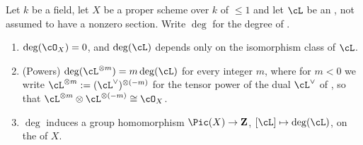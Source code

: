 \begin{lemma}
\label{lem:pc-degree-powers}
Let $k$ be a field, let $X$ be a proper scheme over $k$ of
 $\le1$ and let $\cL$ be an
, not
assumed to have a nonzero section.  Write $\deg$ for the degree of
.
\begin{enumerate}
\item $\deg(\cO_X)=0$, and $\deg(\cL)$ depends only on the isomorphism
class of $\cL$.
\item (Powers) $\deg(\cL^{\otimes m})=m\deg(\cL)$ for every integer $m$,
where for $m<0$ we write $\cL^{\otimes m}:=(\cL^\vee)^{\otimes(-m)}$ for
the tensor power of the dual $\cL^\vee$ of
, so that
$\cL^{\otimes m}\otimes\cL^{\otimes(-m)}\cong\cO_X$.
\item $\deg$ induces a group homomorphism
$\Pic(X)\to\mathbf Z$, $[\cL]\mapsto\deg(\cL)$, on the
 of $X$.
\end{enumerate}
\end{lemma}
